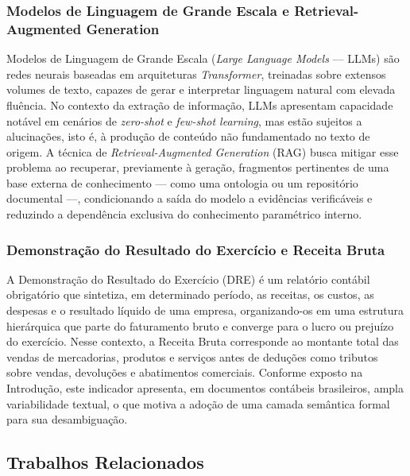 \documentclass[12pt,a4paper]{article}
\begin{document}
\subsubsection{Modelos de Linguagem de Grande Escala e Retrieval-Augmented Generation}

Modelos de Linguagem de Grande Escala (\textit{Large Language Models} --- LLMs) são redes neurais baseadas em arquiteturas \textit{Transformer}, treinadas sobre extensos volumes de texto, capazes de gerar e interpretar linguagem natural com elevada fluência. No contexto da extração de informação, LLMs apresentam capacidade notável em cenários de \textit{zero-shot} e \textit{few-shot learning}, mas estão sujeitos a alucinações, isto é, à produção de conteúdo não fundamentado no texto de origem. A técnica de \textit{Retrieval-Augmented Generation} (RAG) busca mitigar esse problema ao recuperar, previamente à geração, fragmentos pertinentes de uma base externa de conhecimento --- como uma ontologia ou um repositório documental ---, condicionando a saída do modelo a evidências verificáveis e reduzindo a dependência exclusiva do conhecimento paramétrico interno.

\subsubsection{Demonstração do Resultado do Exercício e Receita Bruta}

A Demonstração do Resultado do Exercício (DRE) é um relatório contábil obrigatório que sintetiza, em determinado período, as receitas, os custos, as despesas e o resultado líquido de uma empresa, organizando-os em uma estrutura hierárquica que parte do faturamento bruto e converge para o lucro ou prejuízo do exercício. Nesse contexto, a Receita Bruta corresponde ao montante total das vendas de mercadorias, produtos e serviços antes de deduções como tributos sobre vendas, devoluções e abatimentos comerciais. Conforme exposto na Introdução, este indicador apresenta, em documentos contábeis brasileiros, ampla variabilidade textual, o que motiva a adoção de uma camada semântica formal para sua desambiguação.

\subsection{Trabalhos Relacionados}
\end{document}
